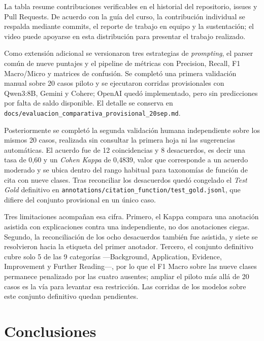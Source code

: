 \documentclass[9pt]{article}
\begin{document}
La tabla resume contribuciones verificables en el historial del repositorio,
issues y Pull Requests. De acuerdo con la guía del curso, la contribución
individual se respalda mediante commits, el reporte de trabajo en equipo y la
sustentación; el video puede apoyarse en esta distribución para presentar el
trabajo realizado.

Como extensión adicional se versionaron tres estrategias de \emph{prompting},
el parser común de nueve puntajes y el pipeline de métricas con Precision,
Recall, F1 Macro/Micro y matrices de confusión. Se completó una primera
validación manual sobre 20 casos piloto y se ejecutaron corridas provisionales
con Qwen3:8B, Gemini y Cohere; OpenAI quedó implementado, pero sin predicciones
por falta de saldo disponible. El detalle se conserva en
\texttt{docs/evaluacion\_comparativa\_provisional\_20sep.md}.

Posteriormente se completó la segunda validación humana independiente sobre los
mismos 20 casos, realizada sin consultar la primera hoja ni las sugerencias
automáticas. El acuerdo fue de 12 coincidencias y 8 desacuerdos, es decir una
tasa de 0,60 y un \emph{Cohen Kappa} de 0,4839, valor que corresponde a un
acuerdo moderado y se ubica dentro del rango habitual para taxonomías de función
de cita con nueve clases. Tras reconciliar los desacuerdos quedó congelado el
\emph{Test Gold} definitivo en
\texttt{annotations/citation\_function/test\_gold.jsonl}, que difiere del
conjunto provisional en un único caso.

Tres limitaciones acompañan esa cifra. Primero, el Kappa compara una anotación
asistida con explicaciones contra una independiente, no dos anotaciones ciegas.
Segundo, la reconciliación de los ocho desacuerdos también fue asistida, y siete
se resolvieron hacia la etiqueta del primer anotador. Tercero, el conjunto
definitivo cubre solo 5 de las 9 categorías ---Background, Application,
Evidence, Improvement y Further Reading---, por lo que el F1 Macro sobre las
nueve clases permanece penalizado por las cuatro ausentes; ampliar el piloto más
allá de 20 casos es la vía para levantar esa restricción. Las corridas de los
modelos sobre este conjunto definitivo quedan pendientes.


\section{Conclusiones}
\end{document}
